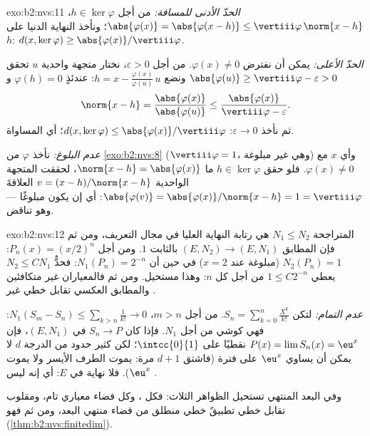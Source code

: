 \begin{solution}{exo:b2:nvs:11}
\emph{الحدّ الأدنى للمسافة:} من أجل $h \in \ker\varphi$،
$\abs{\varphi(x)} = \abs{\varphi(x - h)} \leq
\vertiii\varphi\,\norm{x - h}$؛ ونأخذ النهاية الدنيا على $h$:
$d(x, \ker\varphi) \geq \abs{\varphi(x)}/\vertiii\varphi$.

\emph{الحدّ الأعلى:} يمكن أن نفترض $\varphi(x) \neq 0$. من أجل
$\varepsilon > 0$، نختار متجهة واحدية $u$ تحقق $\abs{\varphi(u)} \geq
\vertiii\varphi - \varepsilon > 0$ ونضع $h = x -
\frac{\varphi(x)}{\varphi(u)}\,u$: عندئذٍ $\varphi(h) = 0$ و
\[
\norm{x - h} = \frac{\abs{\varphi(x)}}{\abs{\varphi(u)}}
\leq \frac{\abs{\varphi(x)}}{\vertiii\varphi - \varepsilon}.
\]
ثم نأخذ $\varepsilon \to 0$: $d(x, \ker\varphi) \leq
\abs{\varphi(x)}/\vertiii\varphi$؛ أي المساواة.

\emph{عدم البلوغ:} نأخذ $\varphi$ من \cref{exo:b2:nvs:8}
($\vertiii\varphi = 1$، وهي غير مبلوغة) وأي $x$ مع
$\varphi(x) \neq 0$. فلو حقق $h \in \ker\varphi$ ما
$\norm{x - h} = \abs{\varphi(x)}$، لحققت المتجهة الواحدية $v = (x -
h)/\norm{x - h}$ العلاقةَ $\abs{\varphi(v)} =
\abs{\varphi(x)}/\norm{x - h} = 1 = \vertiii\varphi$: أي إن
 يكون مبلوغًا --- وهو تناقض.
\end{solution}

\begin{solution}{exo:b2:nvs:12}
المتراجحة $N_1 \leq N_2$ هي رتابة النهاية العليا في مجال التعريف، ومن ثم فإن
المطابق $(E, N_2) \to (E, N_1)$  بالثابت $1$. ومن أجل $P_n(x) =
(x/2)^n$: $N_2(P_n) = 1$ (مبلوغة عند $x = 2$) في حين أن $N_1(P_n) =
2^{-n}$: فحدٌّ $N_2 \leq CN_1$ يعطي $1 \leq C2^{-n}$ من أجل
كل $n$: وهذا مستحيل. ومن ثم فالمعياران غير متكافئين والمطابق
العكسي تقابل خطي غير .

\emph{عدم التمام:} لتكن $S_n = \sum_{k=0}^{n}\frac{X^k}{k!}$.
من أجل $m > n$، $N_1(S_m - S_n) \leq \sum_{k>n}\frac1{k!} \to 0$:
فهي كوشي من أجل $N_1$. فإذا كان $S_n \to P$ في $(E, N_1)$، فإن
$P(x) = \lim S_n(x) = \eu^x$ نقطيًا على $\intcc{0}{1}$؛ لكن كثير حدود
من الدرجة $d$ لا يمكن أن يساوي $\eu^x$ على فترة (فاشتق
$d + 1$ مرة: يموت الطرف الأيسر ولا يموت $\eu^x$). فلا نهاية في
$E$: أي إنه ليس .

وفي البعد المنتهي تستحيل الظواهر الثلاث: فكل ، وكل فضاء معياري تام، ومقلوب
تقابل خطي تطبيقٌ خطي منطلق من فضاء منتهي البعد،
ومن ثم فهو  (\cref{thm:b2:nvs:finitedim}).
\end{solution}

